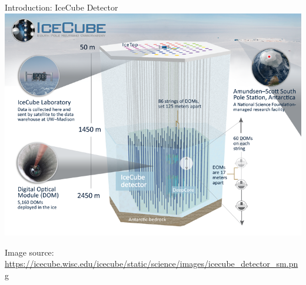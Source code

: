 
\begin{frame}{Introduction: IceCube Detector}
  \centering
  \includegraphics[height=0.9\textheight]{img/icecube_detector_sm}

  \tiny{Image source: \url{https://icecube.wisc.edu/icecube/static/science/images/icecube_detector_sm.png}}
\end{frame}